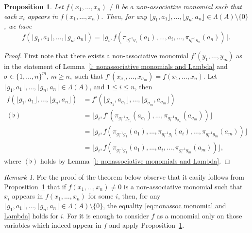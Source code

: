\documentclass[11pt]{amsart}
\numberwithin{equation}{section}
\newtheorem{proposition}[theorem]{Proposition}
\theoremstyle{definition}
\theoremstyle{remark}
\newtheorem{remark}[theorem]{Remark}
\begin{document}
\begin{proposition}\label{p: nonassociative monomials and Lambda}
    Let \(f(x_{1}, \ldots, x_{n}) \neq 0\) be a non-associative monomial such that each \(x_{i}\) appears in \(f(x_{1}, \ldots, x_{n})\). 
    Then, for any \( \lfloor g_1, a_1 \rfloor, \ldots, \lfloor g_n, a_n \rfloor \in \Lambda(A) \setminus \{ 0 \}\), we have
    \begin{equation}\label{eq:nonassoc monomial and Lambda}
        f(\lfloor g_1, a_1 \rfloor, \ldots, \lfloor g_n, a_n \rfloor) 
        = \lfloor g_i, f(\pi_{g_i^{-1}g_1}(a_1), \ldots, a_i, \ldots, \pi_{g_i^{-1}g_n}(a_n)) \rfloor.
    \end{equation}
\end{proposition}
\begin{proof}
    First note that there exists a non-associative monomial \(f'(y_1, \ldots, y_m)\) as in  the statement of Lemma~\ref{l: nonassociative monomials and Lambda} and \(\sigma \in \{ 1, \ldots, n \}^{m}\),  $m\geq n,$ such that \(f'(x_{\sigma_1}, \ldots, x_{\sigma_m}) = f(x_1, \ldots, x_n)\).
    Let \(\lfloor g_1, a_1 \rfloor, \ldots, \lfloor g_n, a_n \rfloor \in \Lambda(A)\),
    and \( 1 \leq i \leq n\), then
    \begin{align*}
        f(\lfloor g_1, a_1 \rfloor, \ldots, \lfloor g_n, a_n \rfloor)
        &= f'(\lfloor g_{\sigma_1}, a_{\sigma_{1}}\rfloor, \ldots, \lfloor g_{\sigma_{m}}, a_{\sigma_{m}} \rfloor ) \\
        (\flat) &= \lfloor g_i, f'(\pi_{g_i^{-1}g_{\sigma_1}}(a_{\sigma_1}), \ldots, \pi_{g_i^{-1}g_{\sigma_m}}(a_{\sigma_m})) \rfloor \\
        &= \lfloor g_i, f(\pi_{g_i^{-1}g_{1}}(a_1), \ldots, \pi_{g_i^{-1}g_{i}}(a_i), \ldots,\pi_{g_i^{-1}g_m}(a_m)) \rfloor \\
        &= \lfloor g_i, f(\pi_{g_i^{-1}g_{1}}(a_1), \ldots, a_i, \ldots,\pi_{g_i^{-1}g_m}(a_m)) \rfloor,
    \end{align*}
    where \((\flat)\) holds by Lemma~\ref{l: nonassociative monomials and Lambda}.
\end{proof}



\begin{remark}\label{rem:nonassoc monomial and Lambda}  For the proof of the theorem below observe that  it easily follows from Proposition~\ref{p: nonassociative monomials and Lambda} that if \(f(x_{1}, \ldots, x_{n}) \neq 0\) is a non-associative monomial such that   \(x_{i}\) appears in \(f(x_{1}, \ldots, x_{n})\) for some $i$,  
    then, for any \( \lfloor g_1, a_1 \rfloor, \ldots, \lfloor g_n, a_n \rfloor \in \Lambda(A) \setminus \{ 0 \}\), 
    the equality \eqref{eq:nonassoc monomial and Lambda} holds for $i.$ For it is enough to consider   $f$  as a monomial  only on those variables which indeed appear in $f$ and apply Proposition~\ref{p: nonassociative monomials and Lambda}.
\end{remark}
\end{document}
